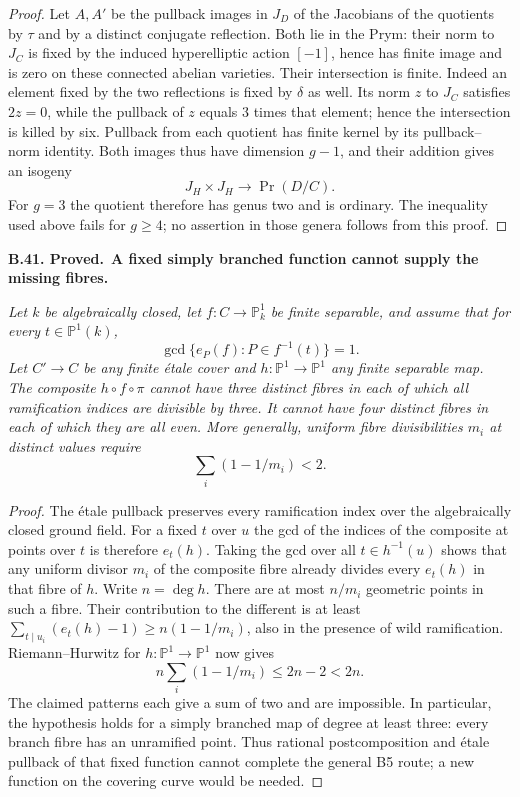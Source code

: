 \documentclass[11pt,a4paper]{article}
\newenvironment{claim}[3]{\par\medskip\noindent\hypertarget{#1}{\textbf{#1. #2.}}\ \textbf{#3.}\par\nopagebreak\smallskip\begingroup\itshape}{\endgroup\par\smallskip}
\begin{document}
\begin{proof}
Let $A,A'$ be the pullback images in $J_D$ of the
Jacobians of the quotients by $\tau$ and by a distinct
conjugate reflection. Both lie in the Prym: their
norm to $J_C$ is fixed by the induced hyperelliptic
action $[-1]$, hence has finite image and is zero
on these connected abelian varieties. Their
intersection is finite. Indeed an element fixed by
the two reflections is fixed by $\delta$ as well.
Its norm $z$ to $J_C$ satisfies $2z=0$, while the
pullback of $z$ equals $3$ times that element; hence
the intersection is killed by six. Pullback from
each quotient has finite kernel by its pullback--norm
identity. Both images thus have dimension $g-1$,
and their addition gives an isogeny
\[
 J_H\times J_H\longrightarrow\Pr(D/C).
\]
For $g=3$ the quotient therefore has genus two and
is ordinary.
The inequality used above fails for $g\ge4$; no
assertion in those genera follows from this proof.
\end{proof}

\begin{claim}{B.41}{Proved}{A fixed simply branched function cannot supply the missing fibres}
Let $k$ be algebraically closed, let $f:C\to\mathbb P^1_k$
be finite separable, and assume that for every
$t\in\mathbb P^1(k)$,
\[
 \gcd\{e_P(f):P\in f^{-1}(t)\}=1.
\]
Let $C'\to C$ be any finite \'etale cover and
$h:\mathbb P^1\to\mathbb P^1$ any finite separable map.
The composite $h\circ f\circ\pi$ cannot have three
distinct fibres in each of which all ramification
indices are divisible by three. It cannot have four
distinct fibres in each of which they are all even.
More generally, uniform fibre divisibilities $m_i$
at distinct values require
\[
 \sum_i(1-1/m_i)<2.
\]
\end{claim}

\begin{proof}
The \'etale pullback preserves every ramification index
over the algebraically closed ground field. For a
fixed $t$ over $u$ the gcd of the indices of the
composite at points over $t$ is therefore $e_t(h)$.
Taking the gcd over all $t\in h^{-1}(u)$ shows that
any uniform divisor $m_i$ of the composite fibre
already divides every $e_t(h)$ in that fibre of $h$.
Write $n=\deg h$. There are at most $n/m_i$ geometric
points in such a fibre. Their contribution to the
different is at least
$\sum_{t\mid u_i}(e_t(h)-1)\ge n(1-1/m_i)$,
also in the presence of wild ramification.
Riemann--Hurwitz for $h:\mathbb P^1\to\mathbb P^1$
now gives
\[
 n\sum_i(1-1/m_i)\le2n-2<2n.
\]
The claimed patterns each give a sum of two and are
impossible. In particular, the hypothesis holds for
a simply branched map of degree at least three:
every branch fibre has an unramified point. Thus
rational postcomposition and \'etale pullback of that
fixed function cannot complete the general B5 route;
a new function on the covering curve would be needed.
\end{proof}
\end{document}
